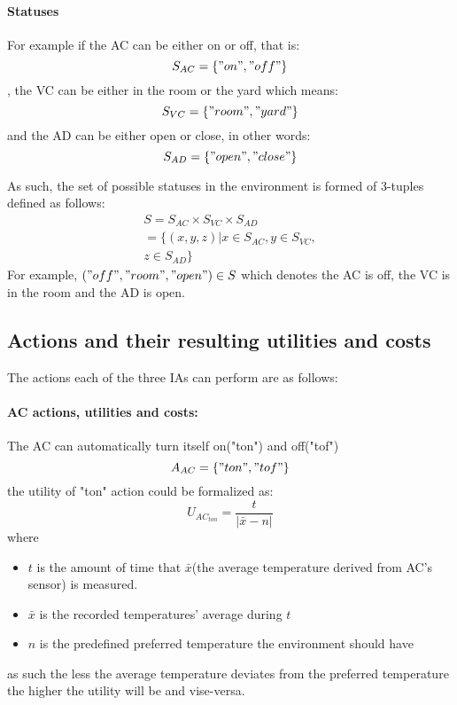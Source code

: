 \documentclass{article}
\begin{document}
\begin{multicols}{2}
			\paragraph{Statuses} For example if the AC can be either on or off, that is:
				\begin{equation}
					S_{AC}=\{"on","off"\}
					\label{eq:ac-statuses}
				\end{equation}
				, the VC can be either in the room or the yard which means:
				\begin{equation}
					S_{VC}=\{"room","yard"\} 
					\label{eq:vc-statuses}
				\end{equation}
				and the AD can be either open or close, in other words:
				\begin{equation}
					S_{AD}=\{"open","close"\}
					\label{eq:ad-statuses}
				\end{equation}
				
				As such, the set of possible statuses in the environment is formed of 3-tuples defined as follows:
				\begin{multline}
					S = S_{AC} \times S_{VC} \times S_{AD} 
					\\
					= \{(x,y,z)| x \in S_{AC}, y \in S_{VC}, 
					\\
					z \in S_{AD} \} 
					\label{eq:example-environment-statuses}
				\end{multline}	
				For example, $("off","room","open") \in S$ which denotes the AC is off, the VC is in the room and the AD is open. 
				
			
			\subsection{Actions and their resulting utilities and costs}
				The actions each of the three IAs can perform are as follows:			
				\paragraph{AC actions, utilities and costs:}
					The AC can automatically turn itself on("ton") and off("tof")
					\begin{equation}
						A_{AC}=\{"ton","tof"\}
						\label{eq:ac-actions}
					\end{equation}
					the utility of "ton" action could be formalized as:
					\begin{equation}
						U_{{AC}_{ton}}= \frac{t}{|\bar{x}-n|}
						\label{eq:ac-action-utility-ton}
					\end{equation}
					where  
					\begin{itemize}
						\item $t$ is the amount of time that $\bar{x}$(the average temperature derived from AC's sensor) is measured.
						\item $\bar{x}$ is the recorded temperatures' average during $t$
						\item $n$ is the predefined preferred temperature the environment should have
					\end{itemize}
					as such the less the average temperature deviates from the preferred temperature the higher the utility will be and vise-versa. 
			 

\end{multicols}
\end{document}
